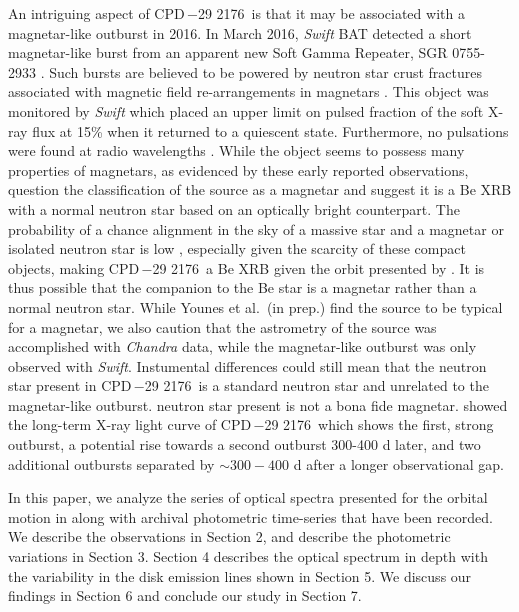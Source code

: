 \documentclass[]{aastex631}
\newcommand{\target}{CPD\,$-$29 2176}
\begin{document}
An intriguing aspect of \target\ is that it may be associated with a magnetar-like outburst in 2016. In March 2016, \textit{Swift} BAT detected a short magnetar-like burst from an apparent new Soft Gamma Repeater, SGR 0755-2933 \citep{2016ATel.8831....1B}. Such bursts are believed to be powered by neutron star crust fractures associated with magnetic field re-arrangements in magnetars \citep{1995MNRAS.275..255T}. This object was monitored by {\it Swift} \citep[e.g.,][]{2016ATel.8868....1A} which placed an upper limit on pulsed fraction of the soft X-ray flux at 15\% when it returned to a quiescent state. Furthermore, no pulsations were found at radio wavelengths \citep{2016ATel.8943....1S}. While the object seems to possess many properties of magnetars, as evidenced by these early reported observations, \citet{2021A&A...647A.165D} question the classification of the source as a magnetar and suggest it is a Be XRB with a normal neutron star based on an optically bright counterpart. 
The probability of a chance alignment in the sky of a massive star and a magnetar or isolated neutron star is low \citep{noel}, especially given the scarcity of these compact objects, making \target\ a Be XRB given the orbit presented by \citet{noel}.
It is thus possible that the companion to the Be star is a magnetar rather than a normal neutron star. While Younes et al.~(in prep.) find the source to be typical for a magnetar, we also caution that the astrometry of the source was accomplished with \textit{Chandra} data, while the magnetar-like outburst was only observed with \textit{Swift}. Instumental differences could still mean that the neutron star present in \target\ is a standard neutron star and unrelated to the magnetar-like outburst.
neutron star present is not a bona fide magnetar. 
\citet{2023arXiv230713308N} showed the long-term X-ray light curve of \target\ which shows the first, strong outburst, a potential rise towards a second outburst 300-400 d later, and two additional outbursts separated by $\sim 300-400$ d after a longer observational gap. 

In this paper, we analyze the series of optical spectra presented for the orbital motion in \citet{noel} along with archival photometric time-series that have been recorded. We describe the observations in Section 2, and describe the photometric variations in Section 3. Section 4 describes the optical spectrum in depth with the variability in the disk emission lines shown in Section 5. We discuss our findings in Section 6 and conclude our study in Section 7. 
\end{document}
